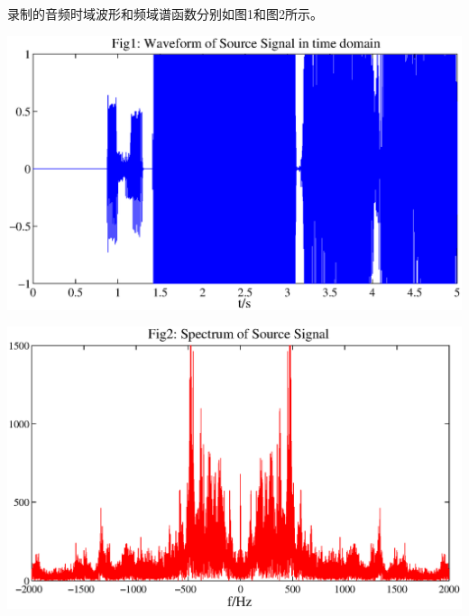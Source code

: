 \documentclass[a4paper,11pt,onecolumn,twoside]{article}
\begin{document}
录制的音频时域波形和频域谱函数分别如图1和图2所示。
\begin{center}
    \includegraphics[width=1\textwidth]{fig1.eps}
\end{center}
\begin{center}
    \includegraphics[width=1\textwidth]{fig2.eps}
\end{center}
\end{document}

